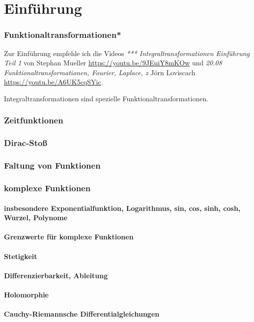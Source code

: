 \part{Einführung}
\section{Funktionaltransformationen*}
Zur Einführung empfehle ich die Videos \textit{*** Integraltransformationen Einführung Teil 1} von Stephan Mueller \url{https://youtu.be/9JEuiY8mKOw} und \textit{20.08 Funktionaltransformationen, Fourier, Laplace, z} Jörn Loviscach \url{https://youtu.be/A6UK5cqSYic}.

Integraltransformationen sind spezielle Funktionaltransformationen.

\section{Zeitfunktionen}
\section{Dirac-Stoß}
\section{Faltung von Funktionen}
\section{komplexe Funktionen}
\subsection{insbesondere Exponentialfunktion, Logarithmus, sin, cos, sinh, cosh, Wurzel, Polynome}
\subsection{Grenzwerte für komplexe Funktionen}
\subsection{Stetigkeit}
\subsection{Differenzierbarkeit, Ableitung}
\subsection{Holomorphie}
\subsection{Cauchy-Riemannsche Differentialgleichungen}
